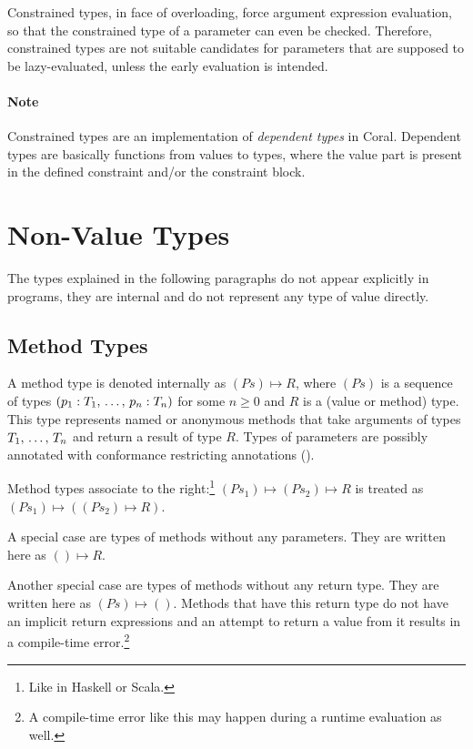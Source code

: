 Constrained types, in face of overloading, force argument expression evaluation, so that the constrained type of a parameter can even be checked. Therefore, constrained types are not suitable candidates for parameters that are supposed to be lazy-evaluated, unless the early evaluation is intended. 

\paragraph{Note}
Constrained types are an implementation of {\em dependent types} in Coral. Dependent types are basically functions from values to types, where the value part is present in the defined constraint and/or the constraint block. 





\section{Non-Value Types}

The types explained in the following paragraphs do not appear explicitly in programs, they are internal and do not represent any type of value directly. 






\subsection{Method Types}
\label{sec:method-types}

A method type is denoted internally as $(Ps) \mapsto R$, where $(Ps)$ is a sequence of types  $(p_1 : T_1 ,\, \ldots ,\, p_n : T_n)$ for some $n \geq 0$ and $R$ is a (value or method) type. This type represents named or anonymous methods that take arguments of types $T_1 ,\, \ldots ,\, T_n$ and return a result of type $R$. Types of parameters are possibly annotated with conformance restricting annotations (). 

Method types associate to the right:\footnote{Like in Haskell or Scala.} \newline
$(Ps_1) \mapsto (Ps_2) \mapsto R$ is treated as $(Ps_1) \mapsto ((Ps_2) \mapsto R)$. 

A special case are types of methods without any parameters. They are written here as $() \mapsto R$. 

Another special case are types of methods without any return type. They are written here as $(Ps) \mapsto ()$. Methods that have this return type do not have an implicit return expressions and an attempt to return a value from it results in a compile-time error.\footnote{A compile-time error like this may happen during a runtime evaluation as well.}

